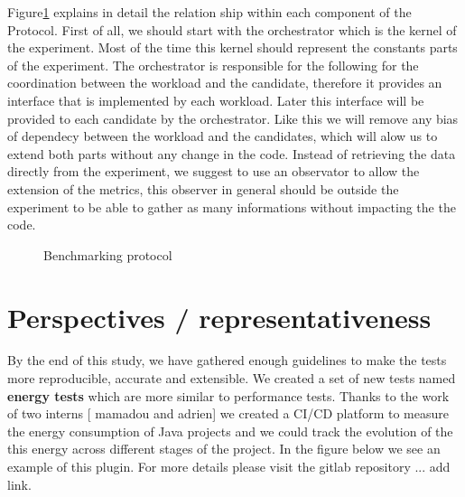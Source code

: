 Figure\ref{fig:benchmarkingprotocol} explains in detail the relation ship within each component of the Protocol. 
First of all, we should start with the orchestrator which is the kernel of the experiment. Most of the time this kernel should represent the constants parts of the experiment. 
The orchestrator is responsible for the following  for the coordination between the workload and the candidate, therefore it provides an interface that is implemented by each workload. 
Later this interface will be provided to each candidate by the orchestrator. Like this we will remove any bias of dependecy between the workload and the candidates, which will alow us to extend both parts without any change in the code. 
Instead of retrieving the data directly from the experiment, we suggest to use an observator to allow the extension of the metrics, this observer in general should be outside the experiment to be able to gather as many informations without impacting the the code.  
\begin{figure}[!htb]
    \caption{Benchmarking protocol}\label{fig:benchmarkingprotocol}
\end{figure}



\section{Perspectives / representativeness}
By the end of this study, we have gathered enough guidelines to make the tests more reproducible, accurate and extensible.
We created a set of new tests named \textbf{energy tests} which are more similar to performance tests.
Thanks to the work of two interns [ mamadou and adrien] we created a CI/CD platform to measure the energy consumption of Java projects and we could track the evolution of the this energy across different stages of the project.
In the figure below we see an example of this plugin.
For more details please visit the gitlab repository ... add link.

